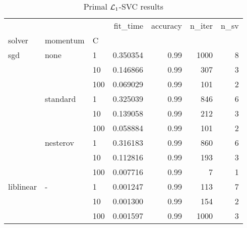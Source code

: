 \begin{table}[H]
\centering
\caption{Primal $\protect \mathcal{L}_1$-SVC results}
\label{primal_l1_svc_cv_results}
\begin{tabular}{lllrrrr}
\toprule
          &   &     &  fit\_time &  accuracy &  n\_iter &  n\_sv \\
solver & momentum & C &           &           &         &       \\
\midrule
sgd & none & 1   &  0.350354 &      0.99 &    1000 &     8 \\
          &   & 10  &  0.146866 &      0.99 &     307 &     3 \\
          &   & 100 &  0.069029 &      0.99 &     101 &     2 \\
          & standard & 1   &  0.325039 &      0.99 &     846 &     6 \\
          &   & 10  &  0.139058 &      0.99 &     212 &     3 \\
          &   & 100 &  0.058884 &      0.99 &     101 &     2 \\
          & nesterov & 1   &  0.316183 &      0.99 &     860 &     6 \\
          &   & 10  &  0.112816 &      0.99 &     193 &     3 \\
          &   & 100 &  0.007716 &      0.99 &       7 &     1 \\
liblinear & - & 1   &  0.001247 &      0.99 &     113 &     7 \\
          &   & 10  &  0.001300 &      0.99 &     154 &     2 \\
          &   & 100 &  0.001597 &      0.99 &    1000 &     3 \\
\bottomrule
\end{tabular}
\end{table}
